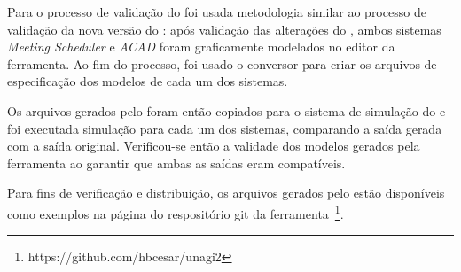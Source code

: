 Para o processo de validação do \unagi foi usada metodologia similar ao processo de validação da nova versão do \zanshin: após validação das alterações do \framework, ambos sistemas \textit{Meeting Scheduler} e \textit{ACAD} foram graficamente modelados no editor da ferramenta. Ao fim do processo, foi usado o conversor para criar os arquivos \xml de especificação dos modelos de cada um dos sistemas. 

Os arquivos gerados pelo \unagi foram então copiados para o sistema de simulação do \zanshin e foi executada simulação para cada um dos sistemas, comparando a saída gerada com a saída original. Verificou-se então a validade dos modelos gerados pela ferramenta ao garantir que ambas as saídas eram compatíveis.

Para fins de verificação e distribuição, os arquivos gerados pelo \unagi estão disponíveis como exemplos na página do respositório git da ferramenta~\footnote{https://github.com/hbcesar/unagi2}.